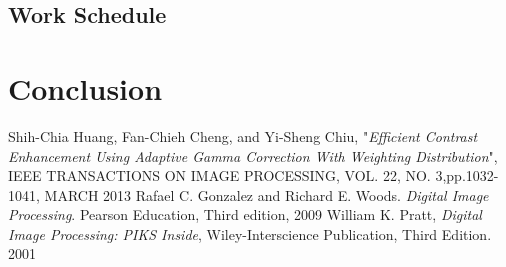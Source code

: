 \documentclass[11pt]{report}
\begin{document}
\section{Work Schedule}


 \chapter{Conclusion}
 \label {con}


 

   
%
\begin{thebibliography}{999}

 Shih-Chia Huang, Fan-Chieh Cheng, and Yi-Sheng Chiu, "\textit{Efficient Contrast Enhancement Using Adaptive Gamma Correction With Weighting Distribution}", IEEE TRANSACTIONS ON IMAGE PROCESSING, VOL. 22, NO. 3,pp.1032-1041, MARCH 2013
 Rafael C. Gonzalez and Richard E. Woods. \textit{Digital Image Processing}. Pearson Education, Third edition, 2009
 William K. Pratt, \textit{Digital Image Processing: PIKS Inside},  Wiley-Interscience Publication, Third Edition.  2001 

\end{thebibliography}
\end{document}
